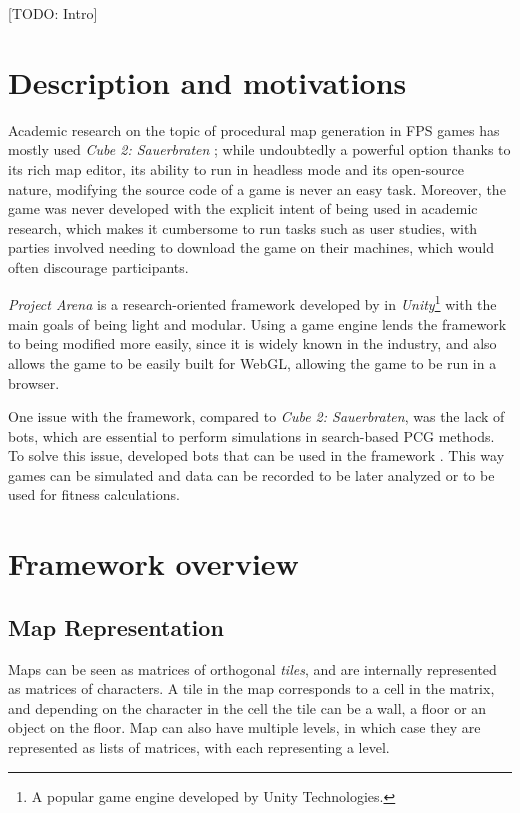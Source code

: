 \documentclass{Configuration_Files/PoliMi3i_thesis}
\begin{document}
[TODO: Intro]

\section{Description and motivations}
\label{sec:pa_description}
Academic research on the topic of procedural map generation in FPS games has mostly used \textit{Cube 2: Sauerbraten} \cite{cardamone_evolving_2011}\cite{lanzi_evolving_2014}\cite{loiacono_fight_2017}; while undoubtedly a powerful option thanks to its rich map editor, its ability to run in headless mode and its open-source nature, modifying the source code of a game is never an easy task. Moreover, the game was never developed with the explicit intent of being used in academic research, which makes it cumbersome to run tasks such as user studies, with parties involved needing to download the game on their machines, which would often discourage participants.

\textit{Project Arena} \cite{ballabio_online_2018} is a research-oriented framework developed by \citeauthor{ballabio_online_2018} in \textit{Unity}\footnote{A popular game engine developed by Unity Technologies.} with the main goals of being light and modular. Using a game engine lends the framework to being modified more easily, since it is widely known in the industry, and also allows the game to be easily built for WebGL, allowing the game to be run in a browser. 

One issue with the framework, compared to \textit{Cube 2: Sauerbraten}, was the lack of bots, which are essential to perform simulations in search-based PCG methods. To solve this issue, \citeauthor{bari_evolutionary-based_2023} developed bots that can be used in the framework \cite{bari_evolutionary-based_2023}. This way games can be simulated and data can be recorded to be later analyzed or to be used for fitness calculations.

\section{Framework overview}
\label{sec:pa_overview}

\subsection{Map Representation}
\label{subsec:map_representation}

Maps can be seen as matrices of orthogonal \textit{tiles}, and are internally represented as matrices of characters. A tile in the map corresponds to a cell in the matrix, and depending on the character in the cell the tile can be a wall, a floor or an object on the floor. Map can also have multiple levels, in which case they are represented as lists of matrices, with each representing a level.
\end{document}
